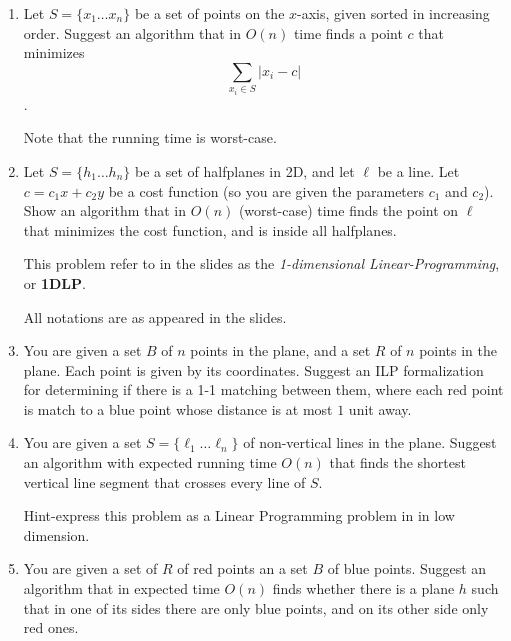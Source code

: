 \documentclass[11pt,epic,leqno,eepic,psfig,]{article}
\renewcommand{\i}{\item}
\begin{document}
\begin{enumerate}
\begin{enumerate}
    If yes, what is the expected running time for finding this function? Prove your answer. 
    

    
    \i What is the expected  running time of your algorithm? 
    
    
    \i Assume $m=n^3$. We pick at random a function $h$ from a universal family. For two files $x, y\in F$ we 
    define a random variable $c_{xy}(h)$ which is $1$ if $h(x)=h(y)$ and is $0$ if $h(x)\neq h(y)$. What is $E(c_{xy}(h))$?
\end{enumerate}







\i Let $S=\{x_1\dots x_n\}$ be a set of points on the $x$-axis, given sorted in increasing order. Suggest an algorithm that in $O(n)$ time finds a point $c$ that minimizes 
$$\sum_{x_i\in S} |x_i-c|$$. 

Note that the running time is worst-case. 



\i Let $S=\{h_1\dots h_n\}$ be a set of halfplanes in 2D, and let $\ell$ be a line.
Let $c=c_1x+c_2y$ be a cost function (so you are given the parameters $c_1$ and $c_2$).
Show an algorithm that in $O(n)$ (worst-case) time finds the point on $\ell$ that minimizes the cost function, and is inside all halfplanes. 

This problem refer to in the slides as the {\em 1-dimensional Linear-Programming}, or  {\bf 1DLP}. 

All notations are as appeared in the slides. 

\item You are given a set $B$ of $n$ points in the plane, and a set $R$ of $n$ points in the plane. Each point  is given by  its coordinates.  Suggest an ILP  formalization  for determining if there is a 1-1 matching between them, where each red point is match to a blue point whose distance is at most $1$ unit away.

\i You are given a set $S=\{\ell_1\dots \ell_n\}$ of non-vertical 
lines in the plane. Suggest an algorithm with expected running time $O(n)$  that finds the shortest vertical line segment that crosses every line of $S$. 

Hint-express this problem as a Linear Programming problem in  in low dimension.


\i You are given a set of $R$ of red points an a set $B$ of blue points. Suggest an algorithm that in expected time  $O(n)$ finds whether there is a plane $h$  such that in one of its sides there are only blue points, and on its other side only red ones. 



\end{enumerate}
\end{document}

